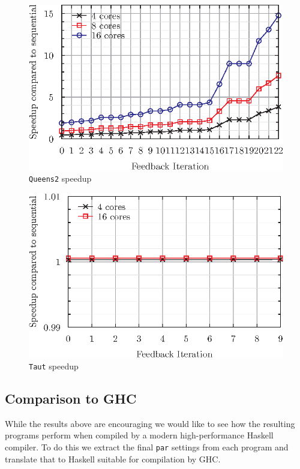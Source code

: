 \begin{figure}[h]
    \includegraphics[scale=0.75]{Informed/Figures/IterQueens2.eps}
    \caption[Q2]{\texttt{Queens2} speedup}
    \label{fig:iterQueens2}
\end{figure}
\begin{figure}[h]
    \includegraphics[scale=0.75]{Informed/Figures/IterTaut.eps}
    \caption[T]{\texttt{Taut} speedup}
    \label{fig:iterTaut}
\end{figure}


\subsection*{Comparison to GHC}

While the results above are encouraging we would like to see how the resulting
programs perform when compiled by a modern high-performance Haskell compiler.
To do this we extract the final \verb-par- settings from each program and
translate that to Haskell suitable for compilation by GHC.

